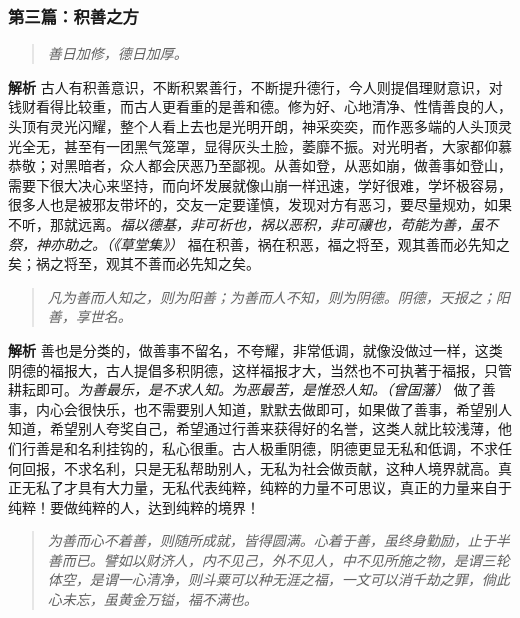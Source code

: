 \subsubsection{第三篇：积善之方}

\begin{quote}\it
    善日加修，德日加厚。
\end{quote}

\textbf{解析} 古人有积善意识，不断积累善行，不断提升德行，今人则提倡理财意识，对钱财看得比较重，而古人更看重的是善和德。修为好、心地清净、性情善良的人，头顶有灵光闪耀，整个人看上去也是光明开朗，神采奕奕，而作恶多端的人头顶灵光全无，甚至有一团黑气笼罩，显得灰头土脸，萎靡不振。对光明者，大家都仰慕恭敬；对黑暗者，众人都会厌恶乃至鄙视。从善如登，从恶如崩，做善事如登山，需要下很大决心来坚持，而向坏发展就像山崩一样迅速，学好很难，学坏极容易，很多人也是被邪友带坏的，交友一定要谨慎，发现对方有恶习，要尽量规劝，如果不听，那就远离。\textit{福以德基，非可祈也，祸以恶积，非可禳也，苟能为善，虽不祭，神亦助之。（《草堂集》）} 福在积善，祸在积恶，福之将至，观其善而必先知之矣；祸之将至，观其不善而必先知之矣。

\begin{quote}\it
    凡为善而人知之，则为阳善；为善而人不知，则为阴德。阴德，天报之；阳善，享世名。
\end{quote}

\textbf{解析} 善也是分类的，做善事不留名，不夸耀，非常低调，就像没做过一样，这类阴德的福报大，古人提倡多积阴德，这样福报才大，当然也不可执著于福报，只管耕耘即可。\textit{为善最乐，是不求人知。为恶最苦，是惟恐人知。（曾国藩）} 做了善事，内心会很快乐，也不需要别人知道，默默去做即可，如果做了善事，希望别人知道，希望别人夸奖自己，希望通过行善来获得好的名誉，这类人就比较浅薄，他们行善是和名利挂钩的，私心很重。古人极重阴德，阴德更显无私和低调，不求任何回报，不求名利，只是无私帮助别人，无私为社会做贡献，这种人境界就高。真正无私了才具有大力量，无私代表纯粹，纯粹的力量不可思议，真正的力量来自于纯粹！要做纯粹的人，达到纯粹的境界！

\begin{quote}\it
    为善而心不着善，则随所成就，皆得圆满。心着于善，虽终身勤励，止于半善而已。譬如以财济人，内不见己，外不见人，中不见所施之物，是谓三轮体空，是谓一心清净，则斗粟可以种无涯之福，一文可以消千劫之罪，倘此心未忘，虽黄金万镒，福不满也。
\end{quote}

